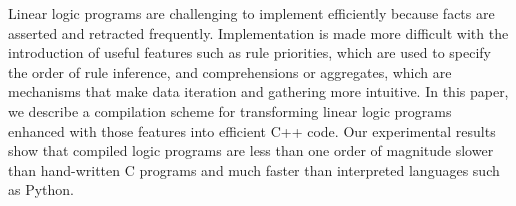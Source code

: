 Linear logic programs are challenging to implement efficiently because facts are
asserted and retracted frequently.  Implementation is made more difficult with
the introduction of useful features such as rule priorities, which are used to
specify the order of rule inference, and comprehensions or aggregates, which are
mechanisms that make data iteration and gathering more intuitive.  In this
paper, we describe a compilation scheme for transforming linear logic programs
enhanced with those features into efficient C++ code. Our experimental results
show that compiled logic programs are less than one order of magnitude slower
than hand-written C programs and much faster than interpreted languages such as
Python.
